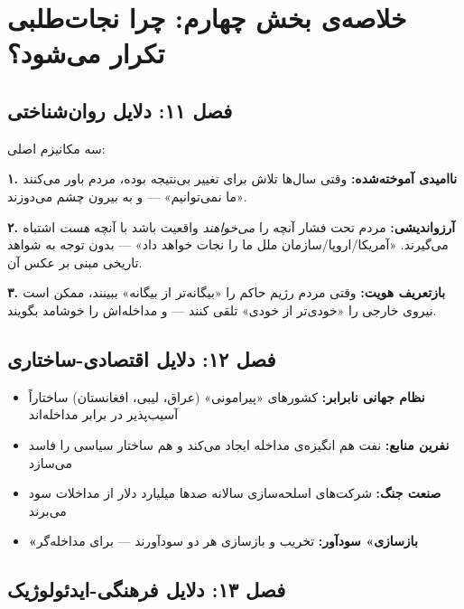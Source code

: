 \section{خلاصه‌ی بخش چهارم: چرا نجات‌طلبی تکرار می‌شود؟}
\label{sec:app-a-part4}

\subsection{فصل ۱۱: دلایل روان‌شناختی}

سه مکانیزم اصلی:

\begin{tcolorbox}[defbox, title={سه مکانیزم روان‌شناختی نجات‌طلبی — زبان ساده}]
\textbf{۱. ناامیدی آموخته‌شده:}
وقتی سال‌ها تلاش برای تغییر بی‌نتیجه بوده، مردم باور می‌کنند «ما نمی‌توانیم» — و به بیرون چشم می‌دوزند.

\textbf{۲. آرزواندیشی:}
مردم تحت فشار آنچه را \textit{می‌خواهند} واقعیت باشد با آنچه \textit{هست} اشتباه می‌گیرند. «آمریکا/اروپا/سازمان ملل ما را نجات خواهد داد» — بدون توجه به شواهد تاریخی مبنی بر عکس آن.

\textbf{۳. بازتعریف هویت:}
وقتی مردم رژیم حاکم را «بیگانه‌تر از بیگانه» ببینند، ممکن است نیروی خارجی را «خودی‌تر از خودی» تلقی کنند — و مداخله‌اش را خوشامد بگویند.
\end{tcolorbox}

\subsection{فصل ۱۲: دلایل اقتصادی-ساختاری}

\begin{itemize}
\item \textbf{نظام جهانی نابرابر:} کشورهای «پیرامونی» (عراق، لیبی، افغانستان) ساختاراً آسیب‌پذیر در برابر مداخله‌اند
\item \textbf{نفرین منابع:} نفت هم انگیزه‌ی مداخله ایجاد می‌کند و هم ساختار سیاسی را فاسد می‌سازد
\item \textbf{صنعت جنگ:} شرکت‌های اسلحه‌سازی سالانه صدها میلیارد دلار از مداخلات سود می‌برند
\item \textbf{«بازسازی» سودآور:} تخریب و بازسازی هر دو سودآورند — برای مداخله‌گر
\end{itemize}

\subsection{فصل ۱۳: دلایل فرهنگی-ایدئولوژیک}

